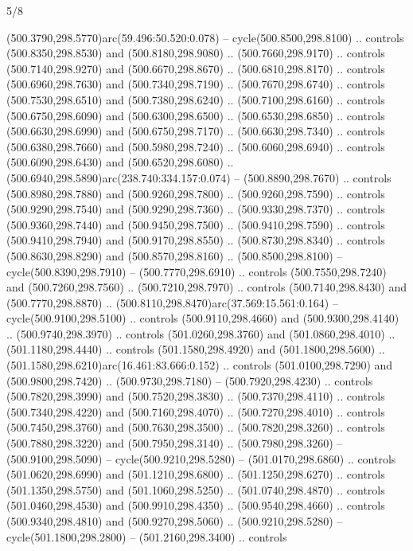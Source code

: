 \begin{flagdescription}{5/8}
\begin{scope}[xshift=0.5\flaglength,yshift=0.5\flagwidth,scale=\flagwidth/475.63]
\begin{scope}[y=0.8pt, x=0.8pt, yscale=-1, xscale=1,shift={(-450,-300)}]
\begin{scope}[cm={{1.0,0.0,0.0,1.0,(-0.0002,0.12556)}},cm={{1.0,0.0,0.0,1.0,(0.00179,0.0)}}]
\begin{scope}[cm={{1.11592,0.0,0.0,1.11592,(-106.89933,-41.77764)}}]
\begin{scope}[draw=black,fill=cfff]
\begin{scope}[fill=black]
  (500.3790,298.5770)arc(59.496:50.520:0.078) -- cycle(500.8500,298.8100) ..
  controls (500.8350,298.8530) and (500.8180,298.9080) .. (500.7660,298.9170) ..
  controls (500.7140,298.9270) and (500.6670,298.8670) .. (500.6810,298.8170) ..
  controls (500.6960,298.7630) and (500.7340,298.7190) .. (500.7670,298.6740) ..
  controls (500.7530,298.6510) and (500.7380,298.6240) .. (500.7100,298.6160) ..
  controls (500.6750,298.6090) and (500.6300,298.6500) .. (500.6530,298.6850) ..
  controls (500.6630,298.6990) and (500.6750,298.7170) .. (500.6630,298.7340) ..
  controls (500.6380,298.7660) and (500.5980,298.7240) .. (500.6060,298.6940) ..
  controls (500.6090,298.6430) and (500.6520,298.6080) ..
  (500.6940,298.5890)arc(238.740:334.157:0.074) -- (500.8890,298.7670) ..
  controls (500.8980,298.7880) and (500.9260,298.7800) .. (500.9260,298.7590) ..
  controls (500.9290,298.7540) and (500.9290,298.7360) .. (500.9330,298.7370) ..
  controls (500.9360,298.7440) and (500.9450,298.7500) .. (500.9410,298.7590) ..
  controls (500.9410,298.7940) and (500.9170,298.8550) .. (500.8730,298.8340) ..
  controls (500.8630,298.8290) and (500.8570,298.8160) .. (500.8500,298.8100) --
  cycle(500.8390,298.7910) -- (500.7770,298.6910) .. controls
  (500.7550,298.7240) and (500.7260,298.7560) .. (500.7210,298.7970) .. controls
  (500.7140,298.8430) and (500.7770,298.8870) ..
  (500.8110,298.8470)arc(37.569:15.561:0.164) -- cycle(500.9100,298.5100) ..
  controls (500.9110,298.4660) and (500.9300,298.4140) .. (500.9740,298.3970) ..
  controls (501.0260,298.3760) and (501.0860,298.4010) .. (501.1180,298.4440) ..
  controls (501.1580,298.4920) and (501.1800,298.5600) ..
  (501.1580,298.6210)arc(16.461:83.666:0.152) .. controls (501.0100,298.7290)
  and (500.9800,298.7420) .. (500.9730,298.7180) -- (500.7920,298.4230) ..
  controls (500.7820,298.3990) and (500.7520,298.3830) .. (500.7370,298.4110) ..
  controls (500.7340,298.4220) and (500.7160,298.4070) .. (500.7270,298.4010) ..
  controls (500.7450,298.3760) and (500.7630,298.3500) .. (500.7820,298.3260) ..
  controls (500.7880,298.3220) and (500.7950,298.3140) .. (500.7980,298.3260) --
  (500.9100,298.5090) -- cycle(500.9210,298.5280) -- (501.0170,298.6860) ..
  controls (501.0620,298.6990) and (501.1210,298.6800) .. (501.1250,298.6270) ..
  controls (501.1350,298.5750) and (501.1060,298.5250) .. (501.0740,298.4870) ..
  controls (501.0460,298.4530) and (500.9910,298.4350) .. (500.9540,298.4660) ..
  controls (500.9340,298.4810) and (500.9270,298.5060) .. (500.9210,298.5280) --
  cycle(501.1800,298.2800) -- (501.2160,298.3400) .. controls

\end{scope}
\end{scope}
\end{scope}
\end{scope}
\end{scope}
\end{scope}
\end{flagdescription}
